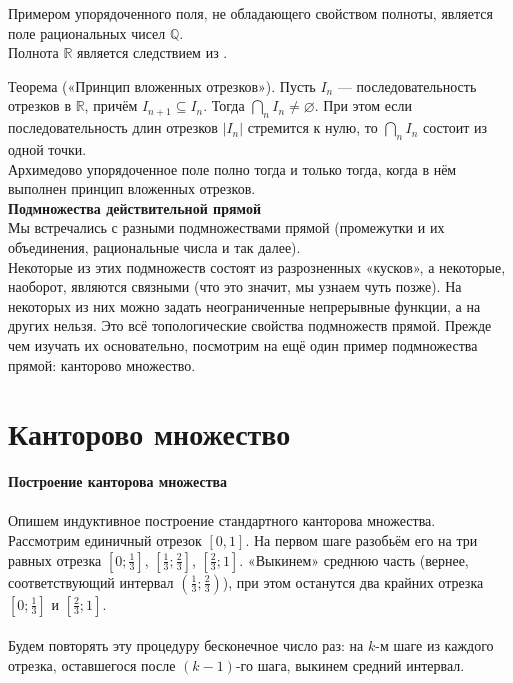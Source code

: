 \documentclass{report}
\begin{document}
Примером упорядоченного поля, не обладающего свойством полноты, является поле рациональных чисел $\mathbb{Q}$. \\ 

Полнота $\mathbb{R}$ является следствием из .

Теорема («Принцип вложенных отрезков»). Пусть $I_n$ — последовательность отрезков в $\mathbb{R}$, причём $I_{n+1} \subseteq I_n$. Тогда $\bigcap_n I_n \neq \varnothing$. При этом если последовательность длин отрезков $|I_n|$ стремится к нулю, то $\bigcap_n I_n$ состоит из одной точки. \\ 

Архимедово упорядоченное поле полно тогда и только тогда, когда в нём выполнен принцип вложенных отрезков. \\ 

\textbf{Подмножества действительной прямой} \\ 

Мы встречались с разными подмножествами прямой (промежутки и их объединения, рациональные числа и так далее).\\

Некоторые из этих подмножеств состоят из разрозненных «кусков», а некоторые, наоборот, являются связными (что это значит, мы узнаем чуть позже). На некоторых из них можно задать неограниченные непрерывные функции, а на других нельзя. Это всё топологические свойства подмножеств прямой. Прежде чем изучать их основательно, посмотрим на ещё один пример подмножества прямой: канторово множество.

\section{Канторово множество}

\textbf{Построение канторова множества} \\ \\ 
Опишем индуктивное построение стандартного канторова множества.\\
Рассмотрим единичный отрезок $[0,1]$. На первом шаге разобьём его на три равных отрезка $\left[0;\frac{1}{3}\right]$, $\left[\frac{1}{3}; \frac{2}{3}\right]$, $\left[\frac{2}{3} ;1\right]$. «Выкинем» среднюю часть (вернее, соответствующий интервал $( \frac{1}{3}; \frac{2}{3} )$), при этом останутся два крайних отрезка $\left[0 ; \frac{1}{3}\right]$ и $\left[\frac{2}{3} ; 1\right]$.\\ \\
Будем повторять эту процедуру бесконечное число раз: на $k$-м шаге из каждого отрезка, оставшегося после $(k-1)$-го шага, выкинем средний интервал.\\
\end{document}
